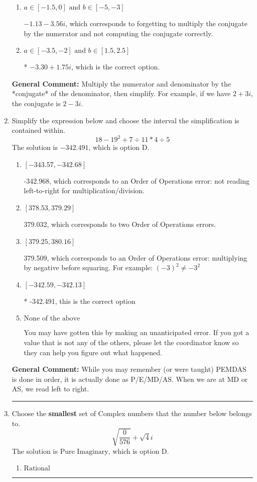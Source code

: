 \documentclass{extbook}[14pt]
\newcommand{\litem}[1]{\item #1

\rule{\textwidth}{0.4pt}}
\begin{document}
\begin{enumerate}
{\begin{enumerate}[label=\Alph*.]
 $-3.30  + 107.00 i$, which corresponds to forgetting to multiply the conjugate by the numerator.
\item \( a \in [-1.5, 0] \text{ and } b \in [-5, -3] \)

 $-1.13  - 3.56 i$, which corresponds to forgetting to multiply the conjugate by the numerator and not computing the conjugate correctly.
\item \( a \in [-3.5, -2] \text{ and } b \in [1.5, 2.5] \)

* $-3.30  + 1.75 i$, which is the correct option.
\end{enumerate}

\textbf{General Comment:} Multiply the numerator and denominator by the *conjugate* of the denominator, then simplify. For example, if we have $2+3i$, the conjugate is $2-3i$.
}
\litem{
Simplify the expression below and choose the interval the simplification is contained within.
\[ 18 - 19^2 + 7 \div 11 * 4 \div 5 \]The solution is \( -342.491 \), which is option D.\begin{enumerate}[label=\Alph*.]
\item \( [-343.57, -342.68] \)

 -342.968, which corresponds to an Order of Operations error: not reading left-to-right for multiplication/division.
\item \( [378.53, 379.29] \)

 379.032, which corresponds to two Order of Operations errors.
\item \( [379.25, 380.16] \)

 379.509, which corresponds to an Order of Operations error: multiplying by negative before squaring. For example: $(-3)^2 \neq -3^2$
\item \( [-342.59, -342.13] \)

* -342.491, this is the correct option
\item \( \text{None of the above} \)

 You may have gotten this by making an unanticipated error. If you got a value that is not any of the others, please let the coordinator know so they can help you figure out what happened.
\end{enumerate}

\textbf{General Comment:} While you may remember (or were taught) PEMDAS is done in order, it is actually done as P/E/MD/AS. When we are at MD or AS, we read left to right.
}
\litem{
Choose the \textbf{smallest} set of Complex numbers that the number below belongs to.
\[ \sqrt{\frac{0}{576}}+\sqrt{4}i \]The solution is \( \text{Pure Imaginary} \), which is option D.\begin{enumerate}[label=\Alph*.]
\item \( \text{Rational} \)


\end{enumerate}}
\end{enumerate}
\end{document}

